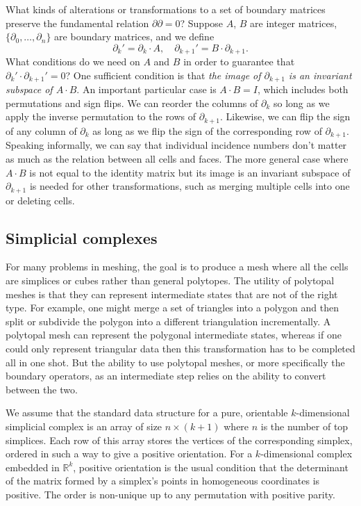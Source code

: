 \documentclass[twocolumn]{article}
\begin{document}
What kinds of alterations or transformations to a set of boundary matrices preserve the fundamental relation $\partial\partial = 0$?
Suppose $A$, $B$ are integer matrices, $\{\partial_0, \ldots, \partial_n\}$ are boundary matrices, and we define
\begin{equation}
    \partial_k' = \partial_k\cdot A, \quad \partial_{k + 1}' = B\cdot\partial_{k + 1}.
\end{equation}
What conditions do we need on $A$ and $B$ in order to guarantee that $\partial_k'\cdot\partial_{k + 1}' = 0$?
One sufficient condition is that \emph{the image of $\partial_{k + 1}$ is an invariant subspace of $A\cdot B$}.
An important particular case is $A\cdot B = I$, which includes both permutations and sign flips.
We can reorder the columns of $\partial_k$ so long as we apply the inverse permutation to the rows of $\partial_{k + 1}$.
Likewise, we can flip the sign of any column of $\partial_k$ as long as we flip the sign of the corresponding row of $\partial_{k + 1}$.
Speaking informally, we can say that individual incidence numbers don't matter as much as the relation between all cells and faces.
The more general case where $A\cdot B$ is not equal to the identity matrix but its image is an invariant subspace of $\partial_{k + 1}$ is needed for other transformations, such as merging multiple cells into one or deleting cells.

\subsection{Simplicial complexes}

For many problems in meshing, the goal is to produce a mesh where all the cells are simplices or cubes rather than general polytopes.
The utility of polytopal meshes is that they can represent intermediate states that are not of the right type.
For example, one might merge a set of triangles into a polygon and then split or subdivide the polygon into a different triangulation incrementally.
A polytopal mesh can represent the polygonal intermediate states, whereas if one could only represent triangular data then this transformation has to be completed all in one shot.
But the ability to use polytopal meshes, or more specifically the boundary operators, as an intermediate step relies on the ability to convert between the two.

We assume that the standard data structure for a pure, orientable $k$-dimensional simplicial complex is an array of size $n \times (k + 1)$ where $n$ is the number of top simplices.
Each row of this array stores the vertices of the corresponding simplex, ordered in such a way to give a positive orientation.
For a $k$-dimensional complex embedded in $\mathbb{R}^k$, positive orientation is the usual condition that the determinant of the matrix formed by a simplex's points in homogeneous coordinates is positive.
The order is non-unique up to any permutation with positive parity.
\end{document}
